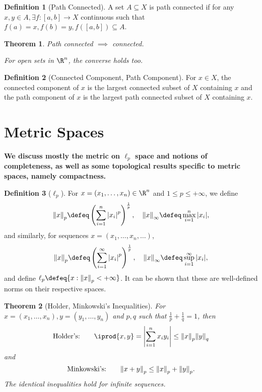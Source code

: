 \documentclass[12pt, oneside]{article}
\theoremstyle{definition}
\newtheorem{defn}{Definition}
\theoremstyle{plain}
\newtheorem{thm}{Theorem}
\theoremstyle{remark}
\let\origsection=\section
\renewcommand\section[1]{\origsection{#1}\label{sec:\thesection}}
\begin{document}
\begin{defn}[Path Connected]
  A set $A \subseteq X$ is path connected if for any $x, y \in A, \exists f : [a, b] \to X$ continuous such that $f(a) = x, f(b) = y, f([a, b]) \subseteq A$.
\end{defn}

\begin{thm}
  Path connected $\implies$ connected.

  For open sets in $\R^n$, the converse holds too.
\end{thm}

\begin{defn}[Connected Component, Path Component]
  For $x \in X$, the connected component of $x$ is the largest connected subset of $X$ containing $x$ and the path component of $x$ is the largest path connected subset of $X$ containing $x$.
\end{defn}

\section{Metric Spaces}

\textbf{We discuss mostly the metric on $\ell_p$ space and notions of completeness, as well as some topological results specific to metric spaces, namely compactness.}

\begin{defn}[$\ell_p$]
  For $x = (x_1, \dots, x_n) \in \R^n$ and $1 \leq p \leq + \infty$, we define \[
  \norm{x}_p \defeq \left(\sum_{i=1}^n \abs{x_i}^p\right)^{\frac{1}{p}}, \quad \norm{x}_\infty \defeq \max_{i=1}^n \abs{x_i},
  \]
  and similarly, for sequences $x = (x_1, \dots, x_n, \dots)$, \[
  \norm{x}_p \defeq   \left(\sum_{i=1}^\infty \abs{x_i}^p\right)^{\frac{1}{p}}, \quad \norm{x}_\infty \defeq \sup_{i=1}^\infty \abs{x_i},
  \]
  and define $\ell_p \defeq \{x : \norm{x}_p < +\infty\}$. It can be shown that these are well-defined norms on their respective spaces.
\end{defn}

\begin{thm}[Holder, Minkowski's Inequalities]
  For $x = (x_1, \dots, x_n), y = (y_1, \dots, y_n)$ and $p, q$ such that $\frac{1}{p} + \frac{1}{q} = 1$, then \[
  \text{Holder's:} \qquad \iprod{x, y} = \abs{\sum_{i=1}^n x_i y_i} \leq \norm{x}_p \norm{y}_q  
  \]
  and \[
  \text{Minkowski's:} \qquad \norm{x + y}_p \leq \norm{x}_p + \norm{y}_p .
  \]
  The identical inequalities hold for infinite sequences.
\end{thm}
\end{document}
